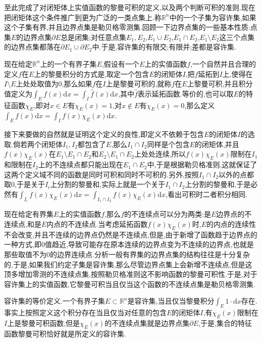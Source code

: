 至此完成了对闭矩体上实值函数的黎曼可积的定义,以及两个判断可积的准则.现在把闭矩体这个条件推广到更为广泛的一类点集上.称$\mathbb{R}^n$中的一个子集为容许集,如果这个子集有界,并且边界点集是勒贝格零测集.回顾一下边界点集的一些基本性质:点集$E$的边界点集$\partial E$总是闭集;对任意点集$E_1,E_2$,$E_1\cup E_2$,$E_1\cap E_2$,$E_1\setminus E_2$这三个点集的边界点集都落在$\partial E_1\cup\partial E_2$中.于是,容许集的有限交;有限并;差都是容许集.

现在给定$\mathbb{R}^n$上的一个有界子集$E$,假设有一个$E$上的实值函数$f$,一个自然并且合理的定义$f$在$E$上的黎曼积分的方式是,取定一个包含$E$的闭矩体$I$,把$f$延拓到$I$上,使得在$I\setminus E$上处处取值为0,那么如果$f$在$I$上是黎曼可积的,就称$f$在$E$上黎曼可积,并且积分值定义为$\int_Ef(x)\mathrm{d}x=\int_I\hat{f}(x)\mathrm{d}x$,其中$\hat{f}$表示延拓函数.等价的,也可以取$E$的特征函数$\chi_E$,即对$x\in E$有$\chi_E(x)=1$,对$x\not\in E$有$\chi_E(x)=0$,那么定义$\int_Ef(x)\mathrm{d}x=\int_If(x)\chi_E(x)\mathrm{d}x$.

接下来要做的自然就是证明这个定义的良性,即定义不依赖于包含$E$的闭矩体$I$的选取.倘若两个闭矩体$I_1,I_2$都包含了$E$,那么$I_1\cap I_2$同样是个包含$E$的闭矩体,并且$f(x)\chi_E(x)$在$E_1\setminus E_1\cap E_2$和$E_2\setminus E_1\cap E_2$上处处连续,所以$f(x)\chi_E(x)$限制在$I_1$和限制在$I_2$上的不连续点都只能出现在$E_1\cap E_2$中,于是根据勒贝格准则,这就保证了这两个定义域不同的函数是同时可积和同时不可积的.另外,按照$I_1\cap I_2$以外的点都取0,于是关于$I_i$上分割的黎曼和,实际上就是一个关于$I_1\cap I_2$上分割的黎曼和,于是必然有$\int_{I_i}f(x)\chi_E(x)\mathrm{d}x=\int_{I_1\cap I_2}f(x)\chi_E(x)\mathrm{d}x$,看出可积时二者积分相同.

现在给定有界集$E$上的实值函数$f$,那么$f$的不连续点可以分为两类:是$E$边界点的不连续点,和是$E$内点的不连续点.当考虑延拓函数$f(x)\chi_E(x)$时,$E$的内点的连续性不会改变,并且不连续的边界点仍然是不连续点,但是,由于新增了函数趋于边界点的一种方式,即0值趋近,导致可能存在原本连续的边界点变为不连续的边界点,也就是那些取值不为0的边界连续点.分析一般有界集的边界点集的结构往往是十分复杂的,于是,如果我们约定子集是容许集,那么尽管边界点集上会新增不连续点,但是这顶多增加零测的不连续点集,按照勒贝格准则这不影响函数的黎曼可积性.于是,对于容许集上的实值函数,它黎曼可积当且仅当这个函数的不连续点集是勒贝格零测集.

容许集的等价定义.一个有界子集$E\subset\mathbb{R}^n$是容许集,当且仅当黎曼积分$\int_E1\cdot\mathrm{d}x$存在.事实上按照定义这个积分存在当且仅当对任意的包含$E$的闭矩体$I$,有$\chi_E(x)$限制在$I$上是黎曼可积函数,但是$\chi_E(x)$的不连续点集就是边界点集$\partial E$,于是,集合的特征函数黎曼可积恰好就是所定义的容许集.

